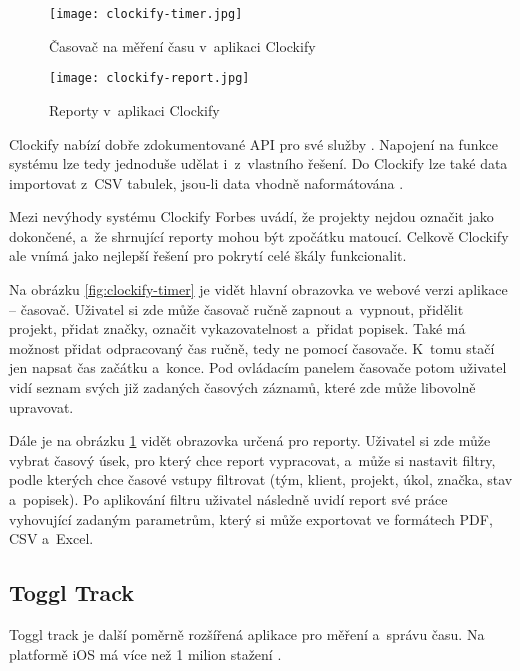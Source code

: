 \begin{figure}[p]
	\centering
	\texttt{[image: clockify-timer.jpg]}
	\caption{Časovač na měření času v~aplikaci Clockify \cite{clockify-features}}
	\label{fig:clockify-timer}
	\vspace{1cm}
	\texttt{[image: clockify-report.jpg]}
	\caption{Reporty v~aplikaci Clockify \cite{clockify-features}}
	\label{fig:clockify-report}
\end{figure}

Clockify nabízí dobře zdokumentované API pro své služby \cite{clockify-api}. Napojení na funkce systému lze tedy jednoduše udělat i~z~vlastního řešení. Do Clockify lze také data importovat z~CSV tabulek, jsou-li data vhodně naformátována \cite{clockify-import-timesheets}.

Mezi nevýhody systému Clockify Forbes uvádí, že projekty nejdou označit jako dokončené, a~že shrnující reporty mohou být zpočátku matoucí. Celkově Clockify ale vnímá jako nejlepší řešení pro pokrytí celé škály funkcionalit.

Na obrázku \ref{fig:clockify-timer} je vidět hlavní obrazovka ve webové verzi aplikace – časovač. Uživatel si zde může časovač ručně zapnout a~vypnout, přidělit projekt, přidat značky, označit vykazovatelnost a~přidat popisek. Také má možnost přidat odpracovaný čas ručně, tedy ne pomocí časovače. K~tomu stačí jen napsat čas začátku a~konce. Pod ovládacím panelem časovače potom uživatel vidí seznam svých již zadaných časových záznamů, které zde může libovolně upravovat.

Dále je na obrázku \ref{fig:clockify-report} vidět obrazovka určená pro reporty. Uživatel si zde může vybrat časový úsek, pro který chce report vypracovat, a~může si nastavit filtry, podle kterých chce časové vstupy filtrovat (tým, klient, projekt, úkol, značka, stav a~popisek). Po aplikování filtru uživatel následně uvidí report své práce vyhovující zadaným parametrům, který si může exportovat ve formátech PDF, CSV a~Excel.

\subsection{Toggl Track}

Toggl track je další poměrně rozšířená aplikace pro měření a~správu času. Na platformě iOS má více než 1 milion stažení \cite{toggl-track-app-magic}. 

